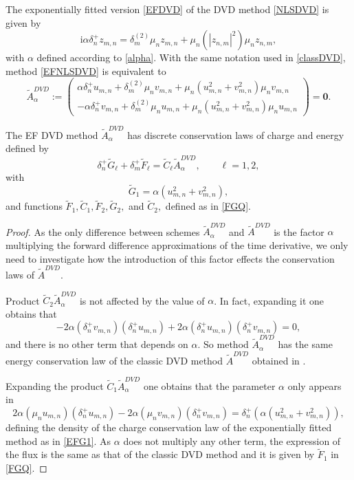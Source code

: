 \documentclass[twoside]{article}
\numberwithin{equation}{section}
\begin{document}
The exponentially fitted version \eqref{EFDVD} of the DVD method \eqref{NLSDVD} is given by
\begin{equation}\label{EFNLSDVD}
\mathrm{i}\alpha\delta_n^+z_{m,n}=\delta_m^{(2)}\mu_nz_{m,n}+\mu_n(|z_{n,m}|^2)\mu_nz_{n,m},
\end{equation}
with $\alpha$ defined according to \eqref{alpha}. With the same notation used in \eqref{classDVD}, method \eqref{EFNLSDVD} is equivalent to
\begin{equation}\label{EFNLSDVDvec}
\widetilde{A}_\alpha^{DVD}:=\left(\begin{array}{c}
\alpha\delta_n^+u_{m,n}+\delta_m^{(2)}\mu_nv_{m,n}+\mu_n(u_{m,n}^2+v_{m,n}^2)\mu_nv_{m,n}\\
-\alpha\delta_n^+v_{m,n}+\delta_m^{(2)}\mu_nu_{m,n}+\mu_n(u_{m,n}^2+v_{m,n}^2)\mu_nu_{m,n}
\end{array}\right)=\mathbf{0}.
\end{equation}
\begin{theorem}\label{theoEFDVD}
The EF DVD method $\widetilde{A}_\alpha^{DVD}$ has discrete conservation laws of charge and energy defined by 
$$\delta_n^+ \widetilde{G}_\ell + \delta_m^+ \widetilde{F}_\ell=\widetilde{C}_\ell \widetilde{A}^{DVD}_\alpha, \qquad \ell=1,2,$$
 with
\begin{equation}\label{EFG1}
\widetilde{G}_1=\alpha(u_{m,n}^2+v_{m,n}^2),
\end{equation}
and functions $\widetilde{F}_1,\widetilde{C}_1,\widetilde{F}_2,\widetilde{G}_2,$ and $\widetilde{C}_2,$ defined as in \eqref{FGQ}.
\end{theorem}
\begin{proof}
As the only difference between schemes $\widetilde{A}_\alpha^{DVD}$ and $\widetilde{A}^{DVD}$ is the factor $\alpha$ multiplying the forward difference approximations of the time derivative, we only need to investigate how the introduction of this factor effects the conservation laws of $\widetilde{A}^{DVD}$. 

Product $\widetilde{C}_2\widetilde{A}_\alpha^{DVD}$ is not affected by the value of $\alpha$. In fact, expanding it one obtains that
$$-2\alpha(\delta_n^+{v_{m,n}})(\delta_n^+{u_{m,n}})+2\alpha(\delta_n^+{u_{m,n}})(\delta_n^+{v_{m,n}})=0,$$
and there is no other term that depends on $\alpha$. So method $\widetilde{A}_\alpha^{DVD}$ has the same energy conservation law of the classic DVD method $\widetilde{A}^{DVD}$ obtained in \cite{AMC}.

Expanding the product $\widetilde{C}_1\widetilde{A}_\alpha^{DVD}$ one obtains that the parameter $\alpha$ only appears in
$$2\alpha(\mu_nu_{m,n})(\delta_n^+u_{m,n})-2\alpha(\mu_nv_{m,n})(\delta_n^+v_{m,n})=\delta_n^+(\alpha(u_{m,n}^2+v_{m,n}^2)),$$
defining the density of the charge conservation law of the exponentially fitted method as in \eqref{EFG1}. As $\alpha$ does not multiply any other term, the expression of the flux is the same as that of the classic DVD method and it is given by $\widetilde F_1$ in \eqref{FGQ}.
\end{proof}
\end{document}
